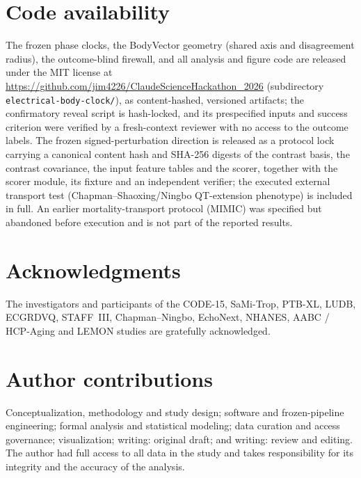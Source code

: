 \documentclass[11pt]{article}
\begin{document}
\section*{Code availability}
The frozen phase clocks, the BodyVector geometry (shared axis and disagreement radius),
the outcome-blind firewall, and all analysis and figure code are released under the MIT
license at \url{https://github.com/jim4226/ClaudeScienceHackathon_2026} (subdirectory
\texttt{electrical-body-clock/}), as content-hashed, versioned artifacts; the confirmatory
reveal script is hash-locked, and its prespecified inputs and success criterion were
verified by a fresh-context reviewer with no access to the outcome labels. The frozen
signed-perturbation direction is released as a protocol lock carrying a canonical
content hash and SHA-256 digests of the contrast basis, the contrast covariance, the input
feature tables and the scorer, together with the scorer module, its fixture and an
independent verifier; the executed external transport test (Chapman--Shaoxing/Ningbo
QT-extension phenotype) is included in full. An earlier mortality-transport protocol
(MIMIC) was specified but abandoned before execution and is not part of the reported
results.

\section*{Acknowledgments}
The investigators and participants of the CODE-15, SaMi-Trop, PTB-XL, LUDB, ECGRDVQ,
STAFF~III, Chapman--Ningbo, EchoNext, NHANES, AABC / HCP-Aging and LEMON studies are
gratefully acknowledged.

\section*{Author contributions}
Conceptualization, methodology and study design; software and frozen-pipeline engineering;
formal analysis and statistical modeling; data curation and access governance;
visualization; writing: original draft; and writing: review and editing. The author had
full access to all data in the study and takes responsibility for its integrity and the accuracy
of the analysis.
\end{document}
